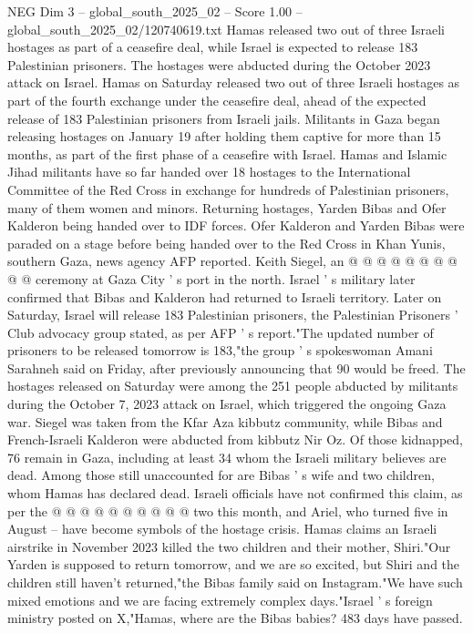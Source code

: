 \begin{textsample}{NEG Dim 3 – global\_south\_2025\_02 – Score 1.00 – global\_south\_2025\_02/120740619.txt}  \label{ex:f3_neg_044}
Hamas released two out of three Israeli hostages as part of a ceasefire deal, while Israel is expected to release 183 Palestinian prisoners.
The hostages were abducted during the October 2023 attack on Israel.
Hamas on Saturday released two out of three Israeli hostages as part of the fourth exchange under the ceasefire deal, ahead of the expected release of 183 Palestinian prisoners from Israeli jails.
Militants in Gaza began releasing hostages on January 19 after holding them captive for more than 15 months, as part of the first phase of a ceasefire with Israel.
Hamas and Islamic Jihad militants have so far handed over 18 hostages to the International Committee of the Red Cross in exchange for hundreds of Palestinian prisoners, many of them women and minors.
Returning hostages, Yarden Bibas and Ofer Kalderon being handed over to IDF forces.
Ofer Kalderon and Yarden Bibas were paraded on a stage before being handed over to the Red Cross in Khan Yunis, southern Gaza, news agency AFP reported.
Keith Siegel, an @ @ @ @ @ @ @ @ @ @ ceremony at Gaza City ' s port in the north.
Israel ' s military later confirmed that Bibas and Kalderon had returned to Israeli territory.
Later on Saturday, Israel will release 183 Palestinian prisoners, the Palestinian Prisoners ' Club advocacy group stated, as per AFP ' s report."The updated number of prisoners to be released tomorrow is 183,"the group ' s spokeswoman Amani Sarahneh said on Friday, after previously announcing that 90 would be freed.
The hostages released on Saturday were among the 251 people abducted by militants during the October 7, 2023 attack on Israel, which triggered the ongoing Gaza war.
Siegel was taken from the Kfar Aza kibbutz community, while Bibas and French-Israeli Kalderon were abducted from kibbutz Nir Oz.
Of those kidnapped, 76 remain in Gaza, including at least 34 whom the Israeli military believes are dead.
Among those still unaccounted for are Bibas ' s wife and two children, whom Hamas has declared dead.
Israeli officials have not confirmed this claim, as per the @ @ @ @ @ @ @ @ @ @ two this month, and Ariel, who turned five in August -- have become symbols of the hostage crisis.
Hamas claims an Israeli airstrike in November 2023 killed the two children and their mother, Shiri."Our Yarden is supposed to return tomorrow, and we are so excited, but Shiri and the children still haven't returned,"the Bibas family said on Instagram."We have such mixed emotions and we are facing extremely complex days."Israel ' s foreign ministry posted on X,"Hamas, where are the Bibas babies? 483 days have passed.

\end{textsample}
